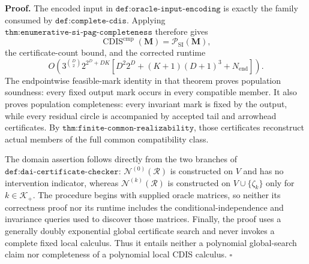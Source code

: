 \textbf{Proof.}
The encoded input in \(\texttt{def:oracle-input-encoding}\) is exactly the family consumed by \(\texttt{def:complete-cdis}\).  Applying \(\texttt{thm:enumerative-si-pag-completeness}\) therefore gives
\[
\operatorname{CDIS}^{\mathrm{cmp}}(\mathbf M)
=\mathcal P_{\mathrm{SI}}(\mathbf M),
\]
the certificate-count bound, and the corrected runtime
\[
O\!\left(
3^{\binom D2}2^{2^D+DK}
\left[D^2 2^D+(K+1)(D+1)^3+N_{\mathrm{end}}\right]
\right).
\]
The endpointwise feasible-mark identity in that theorem proves population soundness: every fixed output mark occurs in every compatible member.  It also proves population completeness: every invariant mark is fixed by the output, while every residual circle is accompanied by accepted tail and arrowhead certificates.  By \(\texttt{thm:finite-common-realizability}\), those certificates reconstruct actual members of the full common compatibility class.

The domain assertion follows directly from the two branches of \(\texttt{def:dai-certificate-checker}\): \(\mathcal N^{(0)}(\mathcal R)\) is constructed on \(V\) and has no intervention indicator, whereas \(\mathcal N^{(k)}(\mathcal R)\) is constructed on \(V\cup\{\zeta_k\}\) only for \(k\in\mathcal K_+\).  The procedure begins with supplied oracle matrices, so neither its correctness proof nor its runtime includes the conditional-independence and invariance queries used to discover those matrices.  Finally, the proof uses a generally doubly exponential global certificate search and never invokes a complete fixed local calculus.  Thus it entails neither a polynomial global-search claim nor completeness of a polynomial local CDIS calculus. \(\square\)